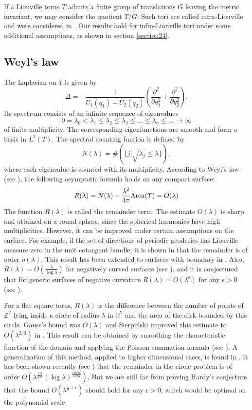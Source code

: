 \documentclass[12pt]{amsart}
\numberwithin{equation}{subsection}
\theoremstyle{definition}
\theoremstyle{plain}
\begin{document}
If a Liouville torus $T$
admits a finite group of translations $G$ leaving the metric invariant, we may consider the quotient $T/G$.  Such tori are called infra-Liouville and were considered in
\cite{3}. Our results hold for infra-Liouville tori under some additional assumptions, as shown in section \ref{section24}.

\subsection{Weyl's law}
The Laplacian on $T$ 
is given by
\[
\Delta = - \frac{1}{U_1(q_1) - U_2(q_2)} \left(\frac{\partial^2}{\partial q_1^2} + \frac{\partial^2}{\partial q_2^2}\right).
\]
Its spectrum consists of an infinite sequence of eigenvalues
$$
0 =  \lambda_0 <  \lambda_1 \leq  \lambda_2 \leq  \lambda_3 \leq ... \leq \lambda_n \leq ... \rightarrow \infty
$$
of finite multiplicity. The corresponding eigenfunctions are smooth and form a basis in $L^2(T)$.
The spectral counting funtion is defined by
$$N(\lambda) = \#(\{j | \sqrt{\lambda_j} \leq \lambda\}),$$
where each eigenvalue is counted with its multiplicity. According to Weyl's law (see \cite{11,12}), the following asymptotic formula holds on any compact surface:
\[
R(\lambda) = N(\lambda) - \frac{\lambda^2}{4\pi} {{\rm {Area}}}(T)  = O(\lambda)
\]
The function $R(\lambda)$ is called the remainder term. The estimate $O(\lambda)$ is sharp and attained on a round sphere, since the spherical harmonics have high multiplicities.
However, it can be improved under certain assumptions on the surface.
For example, if the set of directions of periodic geodesics has Liouville measure zero in the unit cotangent bundle, it is shown in \cite{13} that the remainder is of order $o(\lambda)$.
This result has been extended to surfaces with boundary in \cite{15}.
Also, $R(\lambda) = O \left(\frac{\lambda}{\log \lambda}\right)$ for negatively curved surfaces (see \cite{14}), and
it is conjectured that for generic surfaces of negative curvature $R(\lambda) = O(\lambda^{\epsilon})$ for any $\epsilon > 0$ (see \cite{10}).

For a flat square torus, $R(\lambda)$ is the difference between the number
of points of $\mathbb Z^2$ lying inside a circle of radius $\lambda$ in $\mathbb R^2$ and the area of the disk bounded by this circle.
Gauss's bound was $O(\lambda)$ and Sierpi\'nski improved this estimate to $O(\lambda^{2/3})$ in \cite{16}.
This result can be obtained by smoothing the characteristic function of the domain and applying the Poisson summation formula (see \cite{17}).
A generalization of this method, applied to higher dimensional cases, is found in \cite{5}.
It has been shown recently (see \cite{8,7}) that the remainder in the circle problem is of order $O(\lambda^{\frac{131}{208}}(\log \lambda)^{\frac{18627}{8320}})$.
But we are still far from proving Hardy's conjecture that the bound $O(\lambda^{\frac{1}{2}+\epsilon})$ should hold for any $\epsilon > 0$, which would be optimal on the polynomial scale.
\end{document}
